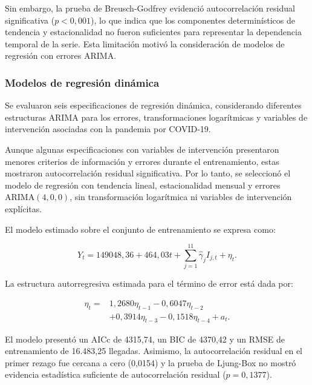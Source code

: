 \documentclass[12pt]{article}
\begin{document}
Sin embargo, la prueba de Breusch-Godfrey evidenció 
autocorrelación residual significativa ($p<0,001$), 
lo que indica que los componentes determinísticos de 
tendencia y estacionalidad no fueron suficientes para 
representar la dependencia temporal de la serie. Esta 
limitación motivó la consideración de modelos de 
regresión con errores ARIMA.

\subsubsection{Modelos de regresión dinámica}

Se evaluaron seis especificaciones de regresión 
dinámica, considerando diferentes estructuras ARIMA 
para los errores, transformaciones logarítmicas y 
variables de intervención asociadas con la pandemia 
por COVID-19.

Aunque algunas especificaciones con variables de 
intervención presentaron menores criterios de 
información y errores durante el entrenamiento, 
estas mostraron autocorrelación residual significativa. 
Por lo tanto, se seleccionó el modelo de regresión 
con tendencia lineal, estacionalidad mensual y errores 
ARIMA$(4,0,0)$, sin transformación logarítmica ni 
variables de intervención explícitas.

El modelo estimado sobre el conjunto de entrenamiento 
se expresa como:

\begin{equation}
Y_t=149048{,}36+464{,}03t+
\sum_{j=1}^{11}\widehat{\gamma}_j I_{j,t}+\eta_t.
\label{eq:dinamica_estimada}
\end{equation}

La estructura autorregresiva estimada para el término 
de error está dada por:

\begin{equation}
\begin{aligned}
\eta_t={}&1{,}2680\eta_{t-1}
-0{,}6047\eta_{t-2}\\
&+0{,}3914\eta_{t-3}
-0{,}1518\eta_{t-4}+a_t.
\end{aligned}
\label{eq:ar4_estimado}
\end{equation}

El modelo presentó un AICc de 4315,74, un BIC de 
4370,42 y un RMSE de entrenamiento de 16.483,25 
llegadas. Asimismo, la autocorrelación residual en 
el primer rezago fue cercana a cero (0,0154) y la 
prueba de Ljung-Box no mostró evidencia estadística 
suficiente de autocorrelación residual ($p=0,1377$).
\end{document}
